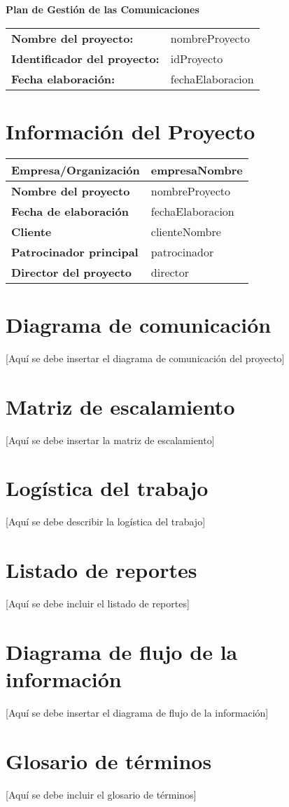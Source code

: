 \documentclass[12pt]{article}
\begin{document}
{\LARGE\textbf{Plan de Gestión de las Comunicaciones}}\\[1cm]

\begin{tabular}{ll}
\textbf{Nombre del proyecto:} & {{nombreProyecto}} \\[0.3cm]
\textbf{Identificador del proyecto:} & {{idProyecto}} \\[0.3cm]
\textbf{Fecha elaboración:} & {{fechaElaboracion}} \\
\end{tabular}

\tableofcontents
\newpage

\section{Información del Proyecto}
\begin{tabular}{|p{5cm}|p{8cm}|}
\hline
\textbf{Empresa/Organización} & {{empresaNombre}} \\
\hline
\textbf{Nombre del proyecto} & {{nombreProyecto}} \\
\hline
\textbf{Fecha de elaboración} & {{fechaElaboracion}} \\
\hline
\textbf{Cliente} & {{clienteNombre}} \\
\hline
\textbf{Patrocinador principal} & {{patrocinador}} \\
\hline
\textbf{Director del proyecto} & {{director}} \\
\hline
\end{tabular}

\section{Diagrama de comunicación}
[Aquí se debe insertar el diagrama de comunicación del proyecto]

\section{Matriz de escalamiento}
[Aquí se debe insertar la matriz de escalamiento]

\section{Logística del trabajo}
[Aquí se debe describir la logística del trabajo]

\section{Listado de reportes}
[Aquí se debe incluir el listado de reportes]

\section{Diagrama de flujo de la información}
[Aquí se debe insertar el diagrama de flujo de la información]

\section{Glosario de términos}
[Aquí se debe incluir el glosario de términos]
\end{document}
